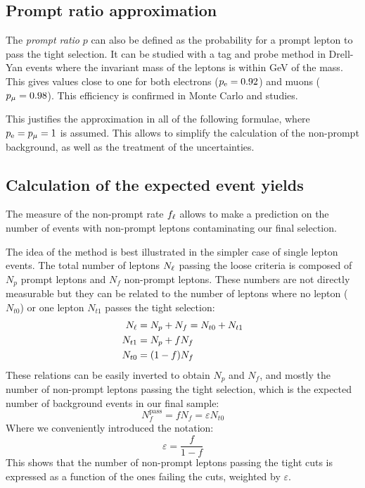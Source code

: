 \subsection{Prompt ratio approximation}
The \emph{prompt ratio} $p$ can also be defined as the probability for
a prompt lepton to pass the tight selection. It can be studied with a tag
and probe method in Drell-Yan events where the invariant mass of the leptons
is within \unit[10]{GeV} of the \Z mass. This gives values close to one for
both electrons ($p_{\mathrm{e}} = 0.92$) and muons ($p_{\mu} = 0.98$). This efficiency is
confirmed in Monte Carlo \Z and \W studies.

This justifies the approximation in all of the following formulae, where
$p_{\mathrm{e}} = p_{\mu} = 1$ is assumed.
This allows to simplify the calculation of the non-prompt background, as
well as the treatment of the uncertainties.

\subsection{Calculation of the expected event
yields}\label{sec:fake_prediction}
The measure of the non-prompt rate $f_{\mathrm{\ell}}$ allows to make a prediction on
the number of events with non-prompt leptons contaminating our final
selection.

The idea of the method is best illustrated in the simpler case of single lepton
events.
The total number of leptons $N_{\mathrm{\ell}}$ passing the loose criteria is composed
of $N_p$ prompt leptons and $N_f$ non-prompt leptons. These numbers are not
directly measurable but they can be related to the number of leptons where
no lepton ($N_{t0}$) or one lepton $N_{t1}$ passes the tight selection:
\begin{align*}
    N_{\mathrm{\ell}} &= N_p + N_f = N_{t0} + N_{t1}\\
    N_{t1} &= N_p + fN_f\\
    N_{t0} &= (1 - f) N_f
\end{align*}
These relations can be easily inverted to obtain $N_p$ and $N_f$, and mostly
the number of non-prompt leptons passing the tight selection, which is the
expected number of background events in our final sample:
\begin{equation*}
    N_f^\text{pass} = fN_f = \varepsilon N_{t0}
\end{equation*}
Where we conveniently introduced the notation:
\begin{equation*}
    \varepsilon = \dfrac{f}{1 - f}
\end{equation*}
This shows that the number of non-prompt leptons passing the tight cuts is
expressed as a function of the ones failing the cuts, weighted by
$\varepsilon$.

